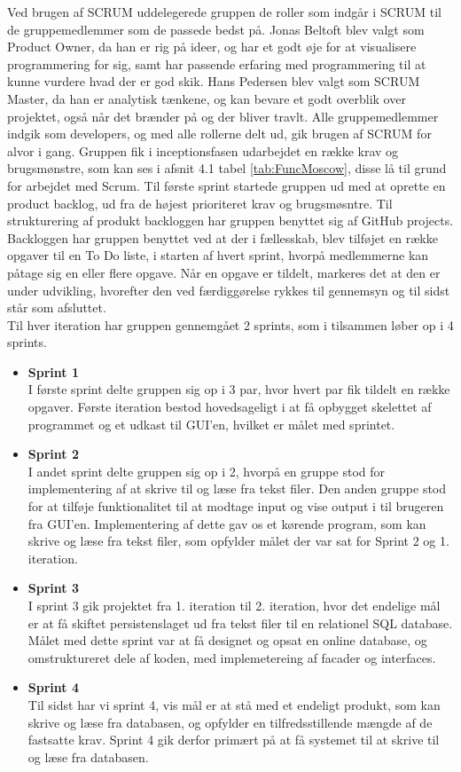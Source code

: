 Ved brugen af SCRUM uddelegerede gruppen de roller som indgår i SCRUM til de gruppemedlemmer som de passede bedst på. Jonas Beltoft blev valgt som Product Owner, da han er rig på ideer, og har et godt øje for at visualisere programmering for sig, samt har passende erfaring med programmering til at kunne vurdere hvad der er god skik.
Hans Pedersen blev valgt som SCRUM Master, da han er analytisk tænkene, og kan bevare et godt overblik over projektet, også når det brænder på og der bliver travlt. 
Alle gruppemedlemmer indgik som developers, og med alle rollerne delt ud, gik brugen af SCRUM for alvor i gang. Gruppen fik i inceptionsfasen udarbejdet en række krav og brugsmønstre, som kan ses i afsnit 4.1 tabel \ref{tab:FuncMoscow}, disse lå til grund for arbejdet med Scrum. Til første sprint startede gruppen ud med at oprette en product backlog, ud fra de højest prioriteret krav og brugsmøsntre. Til strukturering af produkt backloggen har gruppen benyttet sig af GitHub projects. Backloggen har gruppen benyttet ved at der i fællesskab, blev tilføjet en række opgaver til en To Do liste, i starten af hvert sprint, hvorpå medlemmerne kan påtage sig en eller flere opgave. Når en opgave er tildelt, markeres det at den er under udvikling, hvorefter den ved færdiggørelse rykkes til gennemsyn og til sidst står som afsluttet. \\
Til hver iteration har gruppen gennemgået 2 sprints, som i tilsammen løber op i 4 sprints. 
\begin{itemize}
    \item \textbf{Sprint 1} \\
    I første sprint delte gruppen sig op i 3 par, hvor hvert par fik tildelt en række opgaver. Første iteration bestod hovedsageligt i at få opbygget skelettet af programmet og et udkast til GUI'en, hvilket er målet med sprintet. 
    \item \textbf{Sprint 2} \\
    I andet sprint delte gruppen sig op i 2, hvorpå en gruppe stod for implementering af at skrive til og læse fra tekst filer. Den anden gruppe stod for at tilføje funktionalitet til at modtage input og vise output i til brugeren fra GUI'en. Implementering af dette gav os et kørende program, som kan skrive og læse fra tekst filer, som opfylder målet der var sat for Sprint 2 og 1. iteration.
    \item \textbf{Sprint 3} \\
    I sprint 3 gik projektet fra 1. iteration til 2. iteration, hvor det endelige mål er at få skiftet persistenslaget ud fra tekst filer til en relationel SQL database. Målet med dette sprint var at få designet og opsat en online database, og omstruktureret dele af koden, med implemetereing af facader og interfaces. 
    \item \textbf{Sprint 4}\\
    Til sidst har vi sprint 4, vis mål er at stå med et endeligt produkt, som kan skrive og læse fra databasen, og opfylder en tilfredsstillende mængde af de fastsatte krav. Sprint 4 gik derfor primært på at få systemet til at skrive til og læse fra databasen. 
\end{itemize}